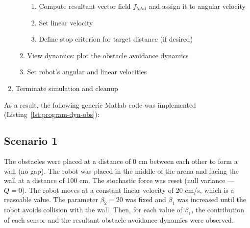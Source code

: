 \begin{enumerate}
\begin{enumerate}
\begin{enumerate}
    \item Compute resultant vector field $f_{total}$ and assign it to angular
      velocity
    \item Set linear velocity
    \item Define stop criterion for target distance (if desired)
    \end{enumerate}
  \item View dynamics: plot the obstacle avoidance dynamics
  \item Set robot's angular and linear velocities
  \end{enumerate}
\item Terminate simulation and cleanup
\end{enumerate}

As a result, the following generic Matlab code was implemented (Listing~\ref{lst:program-dyn-obs}):
%

\subsection{Scenario 1}%
\label{sec:scenario-1-obs}
The obstacles were placed at a distance of 0 cm between each other to form a
wall (no gap). The robot was
placed in the middle of the arena and facing the wall at a distance of 100 cm. The stochastic force was
reset (null variance --- $Q = 0$). The robot moves at a constant linear velocity
of 20 cm/s, which is a reasoable value. The  parameter $\beta_2 = 20$ was fixed
and $\beta_1$ was increased until the robot avoids collision with the wall.
Then, for each value of $\beta_1$, the contribution of each sensor and the
resultant obstacle avoidance dynamics were observed.

